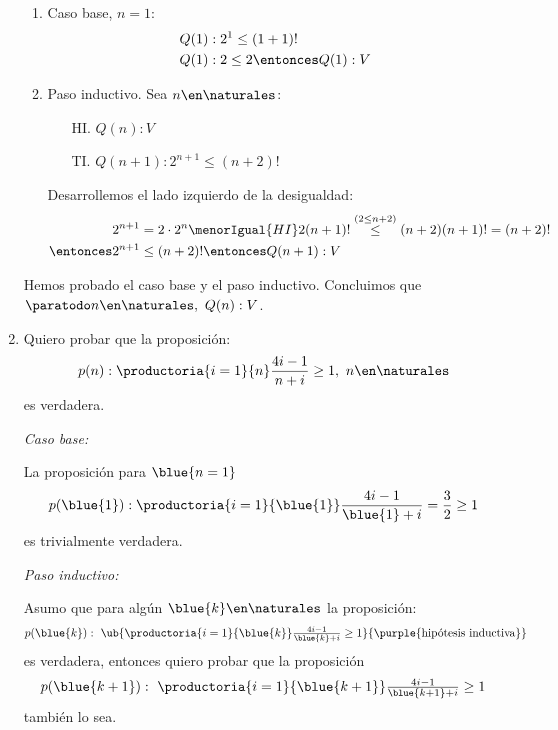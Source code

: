 \begin{enumerate}[label=\magenta{\roman*)}]
        \begin{enumerate}[label=\arabic*)]
          \item Caso base, $n = 1$:
                \begin{align*}
                  Q(1) & : 2^1 \leq (1+1)!           \\
                  Q(1) & : 2 \leq 2 \entonces Q(1):V
                \end{align*}
          \item Paso inductivo. Sea $n \en \naturales$:
                \begin{enumerate}
                  \item[HI.] $Q(n): V$
                  \item[TI.] $Q(n+1): 2^{n+1} \leq (n+2)! $
                \end{enumerate}

                Desarrollemos el lado izquierdo de la desigualdad:
                \begin{align*}
                  2^{n+1}           & = 2 \cdot 2^n \menorIgual{HI} 2 (n+1)! \overset{(2\leq n+2)}{\leq} (n+2)(n+1)! = (n+2)! \\
                  \entonces 2^{n+1} & \leq (n+2)! \entonces Q(n+1):V
                \end{align*}
        \end{enumerate}

        Hemos probado el caso base y el paso inductivo. Concluimos que $\paratodo n \en \naturales, \ Q(n): V$.

  \item
        Quiero probar que la proposición:
        $$
          p(n):
          \productoria{i=1}{n} \frac{4i-1}{n+i} \geq 1, \ n \en \naturales
        $$
        es verdadera.

        \textit{Caso base:}

        La proposición para $\blue{n = 1}$
        $$
          p(\blue{1})  : \productoria{i=1}{\blue{1}} \frac{4i-1}{\blue{1} + i} = \frac{3}{2} \geq 1
        $$
        es trivialmente verdadera.

        \textit{Paso inductivo:}

        Asumo que para algún $\blue{k} \en \naturales$ la proposición:
        $$
          \textstyle
          p(\blue{k}): ~ \ub{
            \productoria{i=1}{\blue{k}} \frac{4i-1}{\blue{k} + i} \geq 1
          }{
            \text{\purple{hipótesis inductiva}}
          }
        $$
        es verdadera, entonces quiero probar que la proposición
        $$
          \textstyle
          p(\blue{k + 1}): ~ \productoria{i=1}{\blue{k + 1}} \frac{4i-1}{\blue{k + 1} + i} \geq 1
        $$
        también lo sea.


\end{enumerate}
